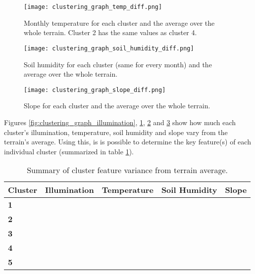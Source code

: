\begin{figure}
\center
	\texttt{[image: clustering\_graph\_temp\_diff.png]}
	\caption{ Monthly temperature for each cluster and the average over the whole terrain. Cluster 2 has the same values as cluster 4.}	
	\label{fig:clustering_graph_temp}
\end{figure}

\begin{figure}
\center
	\texttt{[image: clustering\_graph\_soil\_humidity\_diff.png]}
	\caption{ Soil humidity for each cluster (same for every month) and the average over the whole terrain.}	
	\label{fig:clustering_graph_humidity}
\end{figure}

\begin{figure}
\center
	\texttt{[image: clustering\_graph\_slope\_diff.png]}
	\caption{ Slope for each cluster and the average over the whole terrain.}	
	\label{fig:clustering_graph_slope}
\end{figure}

Figures \ref{fig:clustering_graph_illumination}, \ref{fig:clustering_graph_temp}, \ref{fig:clustering_graph_humidity} and \ref{fig:clustering_graph_slope} show how much each cluster's illumination, temperature, soil humidity and slope vary from the terrain's average. Using this, is is possible to determine the key feature(s) of each individual cluster (summarized in table \ref{tab:clustering_test_cluster_variance}).

\begin{table}[]
  \centering
	    \begin{tabular}{|p{3cm}|p{3cm}|p{3cm}|p{3cm}|p{3cm}|}
		\hline	
  	    \textbf{Cluster} &  \textbf{Illumination} & \textbf{Temperature} & \textbf{Soil Humidity} & \textbf{Slope} \\
		\hline
		\textbf{1} & \textuparrow & \textdownarrow & \textrightarrow & \textdownarrow \textdownarrow \\
		\hline
		\textbf{2} & \textrightarrow & \textuparrow & \textrightarrow & \textuparrow \\
		\hline
		\textbf{3} & \textrightarrow & \textrightarrow & \textrightarrow & \textuparrow \textuparrow \textuparrow \\
		\hline
		\textbf{4} & \textdownarrow \textdownarrow & \textuparrow \textuparrow & \textuparrow \textuparrow \textuparrow & \textrightarrow \\
		\hline
		\textbf{5} & \textdownarrow & \textuparrow & \textdownarrow \textdownarrow & \textuparrow \\
		\hline
		\end{tabular}
		\caption{Summary of cluster feature variance from terrain average.}
	  \label{tab:clustering_test_cluster_variance}
\end{table}